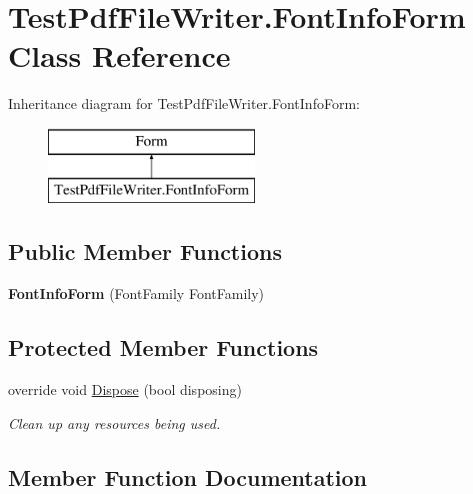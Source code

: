 \hypertarget{class_test_pdf_file_writer_1_1_font_info_form}{}\section{Test\+Pdf\+File\+Writer.\+Font\+Info\+Form Class Reference}
\label{class_test_pdf_file_writer_1_1_font_info_form}
Inheritance diagram for Test\+Pdf\+File\+Writer.\+Font\+Info\+Form\+:\begin{figure}[H]
\begin{center}
\leavevmode
\includegraphics[height=2.000000cm]{class_test_pdf_file_writer_1_1_font_info_form}
\end{center}
\end{figure}
\subsection*{Public Member Functions}
\begin{DoxyCompactItemize}
\item 
{\bfseries Font\+Info\+Form} (Font\+Family Font\+Family)\hypertarget{class_test_pdf_file_writer_1_1_font_info_form_af0f21afed70f890cc5848628d9848d1f}{}\label{class_test_pdf_file_writer_1_1_font_info_form_af0f21afed70f890cc5848628d9848d1f}

\end{DoxyCompactItemize}
\subsection*{Protected Member Functions}
\begin{DoxyCompactItemize}
\item 
override void \hyperlink{class_test_pdf_file_writer_1_1_font_info_form_a50fc21f3d8bfe89387c4d44cdb1cd648}{Dispose} (bool disposing)
\begin{DoxyCompactList}\small\item\em Clean up any resources being used. \end{DoxyCompactList}\end{DoxyCompactItemize}


\subsection{Member Function Documentation}
